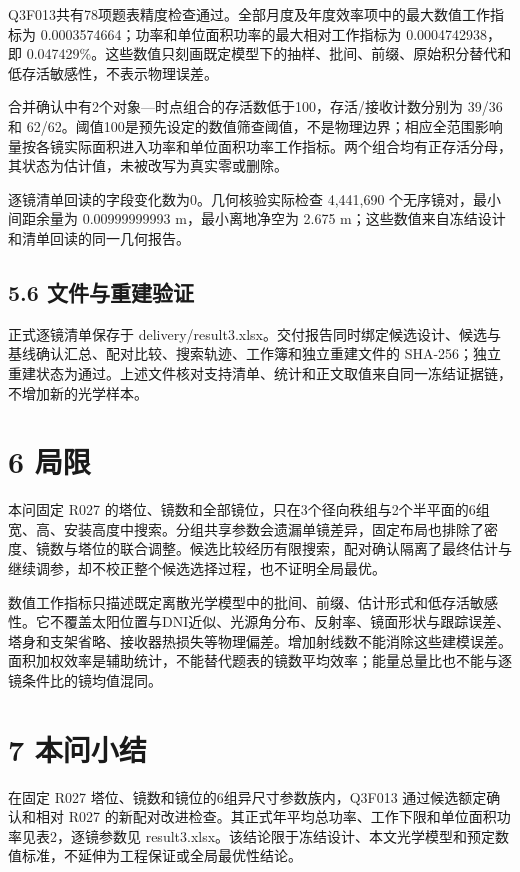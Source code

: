\documentclass[UTF8,fontset=windows,zihao=-4]{ctexart}
\begin{document}
Q3F013共有78项题表精度检查通过。全部月度及年度效率项中的最大数值工作指标为 0.0003574664；功率和单位面积功率的最大相对工作指标为 0.0004742938，即 0.047429\%。这些数值只刻画既定模型下的抽样、批间、前缀、原始积分替代和低存活敏感性，不表示物理误差。

合并确认中有2个对象—时点组合的存活数低于100，存活/接收计数分别为 39/36 和 62/62。阈值100是预先设定的数值筛查阈值，不是物理边界；相应全范围影响量按各镜实际面积进入功率和单位面积功率工作指标。两个组合均有正存活分母，其状态为估计值，未被改写为真实零或删除。

逐镜清单回读的字段变化数为0。几何核验实际检查 4,441,690 个无序镜对，最小间距余量为 0.00999999993 m，最小离地净空为 2.675 m；这些数值来自冻结设计和清单回读的同一几何报告。
\subsection*{5.6 文件与重建验证}

正式逐镜清单保存于 delivery/result3.xlsx。交付报告同时绑定候选设计、候选与基线确认汇总、配对比较、搜索轨迹、工作簿和独立重建文件的 SHA-256；独立重建状态为通过。上述文件核对支持清单、统计和正文取值来自同一冻结证据链，不增加新的光学样本。

\section*{6 局限}

本问固定 R027 的塔位、镜数和全部镜位，只在3个径向秩组与2个半平面的6组宽、高、安装高度中搜索。分组共享参数会遗漏单镜差异，固定布局也排除了密度、镜数与塔位的联合调整。候选比较经历有限搜索，配对确认隔离了最终估计与继续调参，却不校正整个候选选择过程，也不证明全局最优。

数值工作指标只描述既定离散光学模型中的批间、前缀、估计形式和低存活敏感性。它不覆盖太阳位置与DNI近似、光源角分布、反射率、镜面形状与跟踪误差、塔身和支架省略、接收器热损失等物理偏差。增加射线数不能消除这些建模误差。面积加权效率是辅助统计，不能替代题表的镜数平均效率；能量总量比也不能与逐镜条件比的镜均值混同。

\section*{7 本问小结}

在固定 R027 塔位、镜数和镜位的6组异尺寸参数族内，Q3F013 通过候选额定确认和相对 R027 的新配对改进检查。其正式年平均总功率、工作下限和单位面积功率见表2，逐镜参数见 result3.xlsx。该结论限于冻结设计、本文光学模型和预定数值标准，不延伸为工程保证或全局最优性结论。
\end{document}
